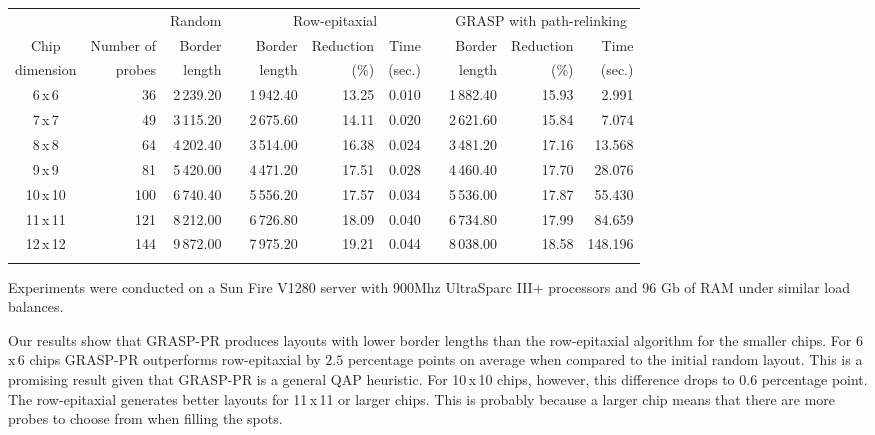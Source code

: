 \documentclass{bioinfo}
\begin{document}
\begin{table}[t]
{\begin{tabular}{crrcrrrcrrr} \toprule
          &            & Random & & \multicolumn{3}{c}{Row-epitaxial}  & & \multicolumn{3}{c}{GRASP with path-relinking}  \\ \cline{3-3} \cline{5-7} \cline{9-11}
Chip      & Number of  & Border & & Border & Reduction & Time          & & Border & Reduction & Time   \\
dimension & probes     & length & & length & (\%)      & (sec.)        & & length & (\%)      & (sec.) \\ \midrule

6\,x\,6   &  36 & 2\,239.20 & & 1\,942.40 & 13.25 & 0.010 & & 1\,882.40 & 15.93 & 2.991   \\
7\,x\,7   &  49 & 3\,115.20 & & 2\,675.60 & 14.11 & 0.020 & & 2\,621.60 & 15.84 & 7.074   \\
8\,x\,8   &  64 & 4\,202.40 & & 3\,514.00 & 16.38 & 0.024 & & 3\,481.20 & 17.16 & 13.568  \\
9\,x\,9   &  81 & 5\,420.00 & & 4\,471.20 & 17.51 & 0.028 & & 4\,460.40 & 17.70 & 28.076  \\
10\,x\,10 & 100 & 6\,740.40 & & 5\,556.20 & 17.57 & 0.034 & & 5\,536.00 & 17.87 & 55.430  \\
11\,x\,11 & 121 & 8\,212.00 & & 6\,726.80 & 18.09 & 0.040 & & 6\,734.80 & 17.99 & 84.659  \\
12\,x\,12 & 144 & 9\,872.00 & & 7\,975.20 & 19.21 & 0.044 & & 8\,038.00 & 18.58 & 148.196 \\ \botrule
\end{tabular}}{Experiments were conducted on a Sun Fire V1280 server with 900Mhz UltraSparc III+ processors and 96 Gb of RAM under similar load balances.}
\end{table}

Our results show that GRASP-PR produces layouts with lower border lengths than the row-epitaxial algorithm for the smaller chips. For 6\,x\,6 chips GRASP-PR outperforms row-epitaxial by $2.5$ percentage points on average when compared to the initial random layout. This is a promising result given that GRASP-PR is a general QAP heuristic. For 10\,x\,10 chips, however, this difference drops to $0.6$ percentage point. The row-epitaxial generates better layouts for 11\,x\,11 or larger chips. This is probably because a larger chip means that there are more probes to choose from when filling the spots.
\end{document}
